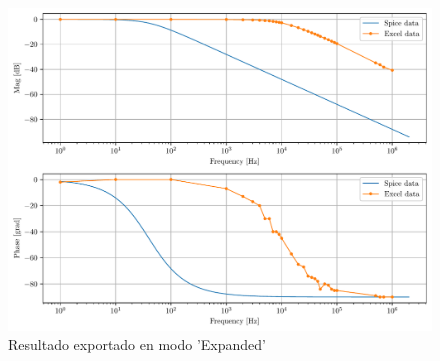 \documentclass[10pt,a4paper]{article}
\begin{document}
\begin{figure}[ht]
\centering
\includegraphics[scale=0.7]{resources/expExport.pdf}
\caption{Resultado exportado en modo 'Expanded'}
\label{fig:expExport}
\end{figure}
\end{document}
